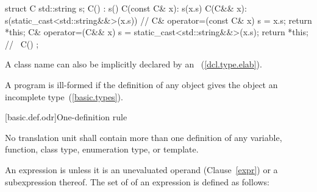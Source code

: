 \begin{codeblock}
struct C {
  std::string s;
  C() : s() { }
  C(const C& x): s(x.s) { }
  C(C&& x): s(static_cast<std::string&&>(x.s)) { }
    // 
  C& operator=(const C& x) { s = x.s; return *this; }
  C& operator=(C&& x) { s = static_cast<std::string&&>(x.s); return *this; }
    // 
  ~C() { }
};
\end{codeblock}
\exitexample

\pnum
\enternote A class name can also be implicitly declared by an
~(\ref{dcl.type.elab}).
\exitnote

\pnum
{}%
A program is ill-formed if the definition of any object gives the object
an incomplete type~(\ref{basic.types}).

%
%
%
%
%
[basic.def.odr]{One-definition rule}

\pnum
No translation unit shall contain more than one definition of any
variable, function, class type, enumeration type, or template.

\pnum
An expression is  unless it is an
unevaluated operand (Clause~\ref{expr}) or a subexpression thereof.
The set of  of an expression  is
defined as follows:

